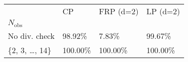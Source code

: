 \begin{tabular}{llll}
 & CP & FRP (d=2) & LP (d=2) \\
$N_{{ \text{{obs}} }}$ &  &  &  \\
No div. check & 98.92\% & 7.83\% & 99.67\% \\
\cline{1-4}
\{2, 3, \ldots, 14\} & 100.00\% & 100.00\% & 100.00\% \\
\cline{1-4}
\end{tabular}
